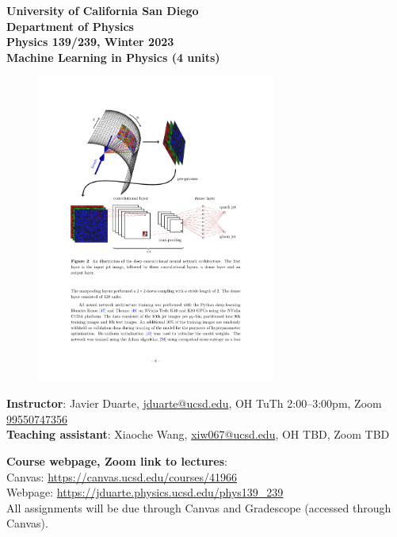\documentclass[12pt]{article}
\begin{document}
\begin{center}
	\textbf{University of California San Diego\\
		Department of Physics\\
		Physics 139/239, Winter 2023\\
		Machine Learning in Physics (4 units)}
\end{center}

\begin{figure}[h!]
	\centering
	\includegraphics[width=0.7\textwidth]{quark_gluon.pdf}
\end{figure}

\noindent\textbf{Instructor}: Javier Duarte, \href{mailto:jduarte@ucsd.edu}{jduarte@ucsd.edu}, OH TuTh 2:00--3:00pm, Zoom \href{https://ucsd.zoom.us/j/99550747356}{99550747356}\\
\noindent \textbf{Teaching assistant}: Xiaoche Wang, \href{mailto:xiw067@ucsd.edu}{xiw067@ucsd.edu}, OH TBD, Zoom TBD

\noindent\textbf{Course webpage, Zoom link to lectures}:\\
\hspace*{1cm}Canvas: \href{https://canvas.ucsd.edu/courses/41966}{https://canvas.ucsd.edu/courses/41966}\\
\hspace*{1cm}Webpage: \href{https://jduarte.physics.ucsd.edu/phys139\_239}{https://jduarte.physics.ucsd.edu/phys139\_239}\\
\hspace*{1cm}All assignments will be due through Canvas and Gradescope (accessed through Canvas).\\
\end{document}
